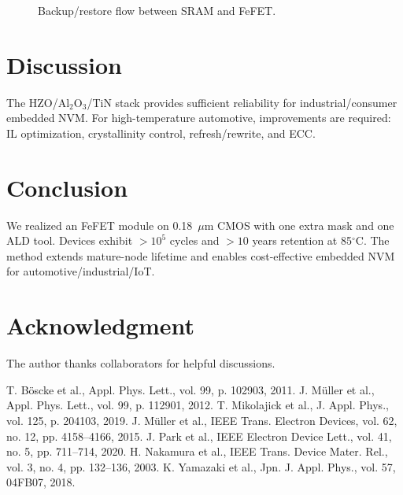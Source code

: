 \documentclass[conference]{IEEEtran}
\begin{document}
\begin{figure}[!t]
  \centering
  \caption{Backup/restore flow between SRAM and FeFET.}
  \label{fig:backup_flow}
\end{figure}

\section{Discussion}
The HZO/Al$_2$O$_3$/TiN stack provides sufficient reliability for industrial/consumer embedded NVM. 
For high-temperature automotive, improvements are required: IL optimization, crystallinity control, refresh/rewrite, and ECC.

\section{Conclusion}
We realized an FeFET module on 0.18~$\mu$m CMOS with one extra mask and one ALD tool. 
Devices exhibit $>10^5$ cycles and $>10$ years retention at 85$^\circ$C. 
The method extends mature-node lifetime and enables cost-effective embedded NVM for automotive/industrial/IoT.

\section*{Acknowledgment}
The author thanks collaborators for helpful discussions.


\begin{thebibliography}{1}
 T. Böscke et al., Appl. Phys. Lett., vol. 99, p. 102903, 2011.
 J. Müller et al., Appl. Phys. Lett., vol. 99, p. 112901, 2012.
 T. Mikolajick et al., J. Appl. Phys., vol. 125, p. 204103, 2019.
 J. Müller et al., IEEE Trans. Electron Devices, vol. 62, no. 12, pp. 4158–4166, 2015.
 J. Park et al., IEEE Electron Device Lett., vol. 41, no. 5, pp. 711–714, 2020.
 H. Nakamura et al., IEEE Trans. Device Mater. Rel., vol. 3, no. 4, pp. 132–136, 2003.
 K. Yamazaki et al., Jpn. J. Appl. Phys., vol. 57, 04FB07, 2018.
\end{thebibliography}
\end{document}
